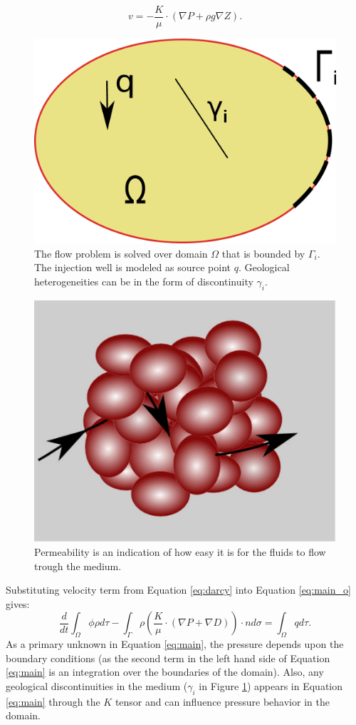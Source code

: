 \begin{equation}
  v=-\frac{K}{\mu}\cdot (\nabla{P}+\rho g\nabla{Z}).
  \label{eq:darcy_c}
\end{equation} 

\begin{figure}[thb] 
  \centering{}
  \includegraphics[scale=0.3]{./figurer/BCPB}
  \caption{The flow problem is solved over domain $\Omega$ that is bounded by $\Gamma_i$. The injection well is modeled as source point $q$. Geological heterogeneities can be in the form of discontinuity $\gamma_i$.}
  \label{fig:prsDmn}
\end{figure}

\begin{figure}
 \centering{}
 \includegraphics[width=0.35\linewidth]{./figurer/singlePerm}
 \caption{Permeability is an indication of how easy it is for the fluids to flow
trough the medium.}
 \label{fig:snglK}
\end{figure}

Substituting velocity term from Equation \ref{eq:darcy} into Equation
\ref{eq:main_o} gives:
\begin{equation}
  \frac{d}{dt}\int_{\Omega}\phi\rho d\tau-\int_{\Gamma}\rho
\left(\frac{K}{\mu}\cdot (\nabla{P}+\nabla{D})\right) \cdot n d\sigma=\int_{\Omega}qd\tau.
  \label{eq:main}
\end{equation} As a primary unknown in Equation \ref{eq:main}, the pressure depends upon the boundary conditions (as the second term in the left hand side of
Equation \ref{eq:main} is an integration over the boundaries of the domain). Also, any geological discontinuities in the medium
($\gamma_i$ in Figure \ref{fig:prsDmn}) appears in Equation \ref{eq:main} through the $K$ tensor and can influence pressure behavior in the domain.

